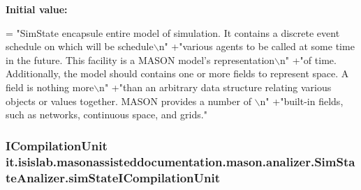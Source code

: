 {\bfseries Initial value\-:}
\begin{DoxyCode}
= \textcolor{stringliteral}{"SimState encapsule entire model of simulation. It contains a discrete event schedule on which will be
       schedule\(\backslash\)n"}
                    +\textcolor{stringliteral}{"various agents to be called at some time in the future. This facility is a MASON
       model's representation\(\backslash\)n"} 
                    +\textcolor{stringliteral}{"of time. Additionally, the model should contains one or more fields to represent
       space. A field is nothing more\(\backslash\)n"}
                    +\textcolor{stringliteral}{"than an arbitrary data structure relating various objects or values together. MASON
       provides a number of \(\backslash\)n"}
                    +\textcolor{stringliteral}{"built-in fields, such as networks, continuous space, and grids."}
\end{DoxyCode}
\hypertarget{classit_1_1isislab_1_1masonassisteddocumentation_1_1mason_1_1analizer_1_1_sim_state_analizer_a5a4cf52aff7f9d349b30f11960687b9c}{
\subsubsection[{sim\-State\-I\-Compilation\-Unit}]{\setlength{\rightskip}{0pt plus 5cm}I\-Compilation\-Unit it.\-isislab.\-masonassisteddocumentation.\-mason.\-analizer.\-Sim\-State\-Analizer.\-sim\-State\-I\-Compilation\-Unit\hspace{0.3cm}{\ttfamily [private]}}}\label{classit_1_1isislab_1_1masonassisteddocumentation_1_1mason_1_1analizer_1_1_sim_state_analizer_a5a4cf52aff7f9d349b30f11960687b9c}
